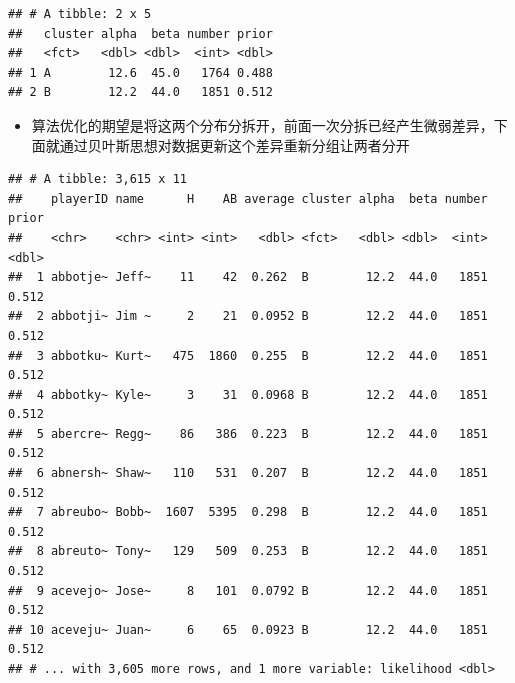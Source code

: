 \documentclass[]{book}
\newenvironment{Shaded}{\begin{snugshade}}{\end{snugshade}}
\newcommand{\CommentTok}[1]{\textcolor[rgb]{0.56,0.35,0.01}{\textit{#1}}}
\newcommand{\DataTypeTok}[1]{\textcolor[rgb]{0.13,0.29,0.53}{#1}}
\newcommand{\DecValTok}[1]{\textcolor[rgb]{0.00,0.00,0.81}{#1}}
\newcommand{\KeywordTok}[1]{\textcolor[rgb]{0.13,0.29,0.53}{\textbf{#1}}}
\newcommand{\NormalTok}[1]{#1}
\newcommand{\OperatorTok}[1]{\textcolor[rgb]{0.81,0.36,0.00}{\textbf{#1}}}
\newcommand{\StringTok}[1]{\textcolor[rgb]{0.31,0.60,0.02}{#1}}
\providecommand{\tightlist}{%
  \setlength{\itemsep}{0pt}\setlength{\parskip}{0pt}}
\begin{document}
\begin{verbatim}
## # A tibble: 2 x 5
##   cluster alpha  beta number prior
##   <fct>   <dbl> <dbl>  <int> <dbl>
## 1 A        12.6  45.0   1764 0.488
## 2 B        12.2  44.0   1851 0.512
\end{verbatim}

\begin{itemize}
\tightlist
\item
  算法优化的期望是将这两个分布分拆开，前面一次分拆已经产生微弱差异，下面就通过贝叶斯思想对数据更新这个差异重新分组让两者分开
\end{itemize}

\begin{Shaded}
\end{Shaded}

\begin{verbatim}
## # A tibble: 3,615 x 11
##    playerID name      H    AB average cluster alpha  beta number prior
##    <chr>    <chr> <int> <int>   <dbl> <fct>   <dbl> <dbl>  <int> <dbl>
##  1 abbotje~ Jeff~    11    42  0.262  B        12.2  44.0   1851 0.512
##  2 abbotji~ Jim ~     2    21  0.0952 B        12.2  44.0   1851 0.512
##  3 abbotku~ Kurt~   475  1860  0.255  B        12.2  44.0   1851 0.512
##  4 abbotky~ Kyle~     3    31  0.0968 B        12.2  44.0   1851 0.512
##  5 abercre~ Regg~    86   386  0.223  B        12.2  44.0   1851 0.512
##  6 abnersh~ Shaw~   110   531  0.207  B        12.2  44.0   1851 0.512
##  7 abreubo~ Bobb~  1607  5395  0.298  B        12.2  44.0   1851 0.512
##  8 abreuto~ Tony~   129   509  0.253  B        12.2  44.0   1851 0.512
##  9 acevejo~ Jose~     8   101  0.0792 B        12.2  44.0   1851 0.512
## 10 aceveju~ Juan~     6    65  0.0923 B        12.2  44.0   1851 0.512
## # ... with 3,605 more rows, and 1 more variable: likelihood <dbl>
\end{verbatim}
\end{document}
